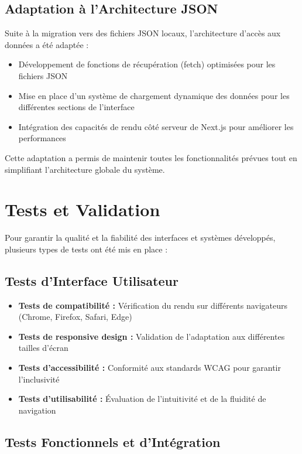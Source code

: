 \subsection{Adaptation à l'Architecture JSON}

Suite à la migration vers des fichiers JSON locaux, l'architecture d'accès aux données a été adaptée :

\begin{itemize}
  \item Développement de fonctions de récupération (fetch) optimisées pour les fichiers JSON
  \item Mise en place d'un système de chargement dynamique des données pour les différentes sections de l'interface
  \item Intégration des capacités de rendu côté serveur de Next.js pour améliorer les performances
\end{itemize}

Cette adaptation a permis de maintenir toutes les fonctionnalités prévues tout en simplifiant l'architecture globale du système.

\section{Tests et Validation}

Pour garantir la qualité et la fiabilité des interfaces et systèmes développés, plusieurs types de tests ont été mis en place :

\subsection{Tests d'Interface Utilisateur}

\begin{itemize}
  \item \textbf{Tests de compatibilité :} Vérification du rendu sur différents navigateurs (Chrome, Firefox, Safari, Edge)
  \item \textbf{Tests de responsive design :} Validation de l'adaptation aux différentes tailles d'écran
  \item \textbf{Tests d'accessibilité :} Conformité aux standards WCAG pour garantir l'inclusivité
  \item \textbf{Tests d'utilisabilité :} Évaluation de l'intuitivité et de la fluidité de navigation
\end{itemize}

\subsection{Tests Fonctionnels et d'Intégration}

